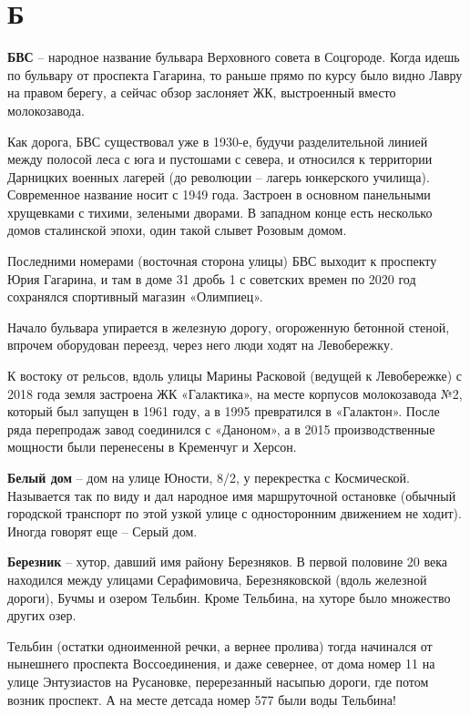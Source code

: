 \chapter*{Б}

\textbf{БВС} – народное название бульвара Верховного совета в Соцгороде. Когда идешь по бульвару от проспекта Гагарина, то раньше прямо по курсу было видно Лавру на правом берегу, а сейчас обзор заслоняет ЖК, выстроенный вместо молокозавода.

Как дорога, БВС существовал уже в 1930-е, будучи разделительной линией между полосой леса с юга и пустошами с севера, и относился к территории Дарницких военных лагерей (до революции – лагерь юнкерского училища). Современное название носит с 1949 года. Застроен в основном панельными хрущевками с тихими, зелеными дворами. В западном конце есть несколько домов сталинской эпохи, один такой слывет Розовым домом.

Последними номерами (восточная сторона улицы) БВС выходит к проспекту Юрия Гагарина, и там в доме 31 дробь 1 с советских времен по 2020 год сохранялся спортивный магазин «Олимпиец».

Начало бульвара упирается в железную дорогу, огороженную бетонной стеной, впрочем оборудован переезд, через него люди ходят на Левобережку.

К востоку от рельсов, вдоль улицы Марины Расковой (ведущей к Левобережке) с 2018 года земля застроена ЖК «Галактика», на месте корпусов молокозавода №2, который был запущен в 1961 году, а в 1995 превратился в «Галактон». После ряда перепродаж завод соединился с «Даноном», а в 2015 производственные мощности были перенесены в Кременчуг и Херсон.\\

\medskip

\textbf{Белый дом} – дом на улице Юности, 8/2, у перекрестка с Космической. Называется так по виду и дал народное имя маршруточной остановке (обычный городской транспорт по этой узкой улице с односторонним движением не ходит). Иногда говорят еще – Серый дом. \\

\medskip

\textbf{Березник} – хутор, давший имя району Березняков. В первой половине 20 века находился между улицами Серафимовича, Березняковской (вдоль железной дороги), Бучмы и озером Тельбин. Кроме Тельбина, на хуторе было множество других озер.

Тельбин (остатки одноименной речки, а вернее пролива) тогда начинался от нынешнего проспекта Воссоединения, и даже севернее, от дома номер 11 на улице Энтузиастов на Русановке, перерезанный насыпью дороги, где потом возник проспект. А на месте детсада номер 577 были воды Тельбина!

